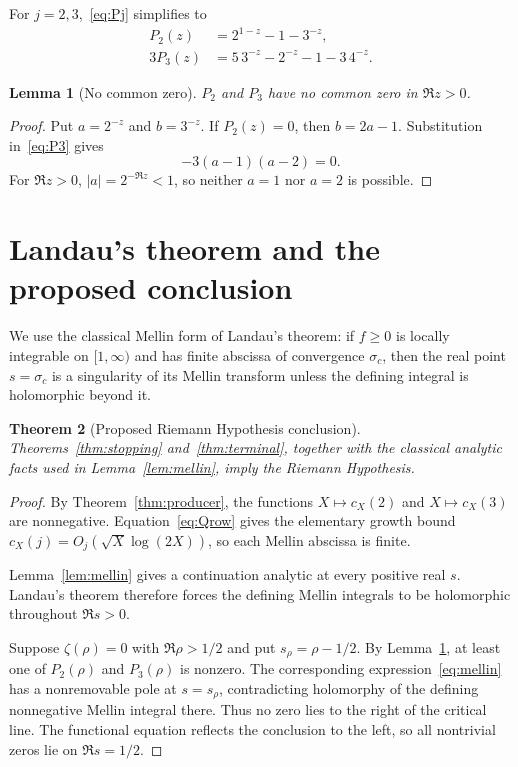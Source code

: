 \documentclass[11pt]{article}
\newtheorem{theorem}{Theorem}[section]
\newtheorem{lemma}[theorem]{Lemma}
\begin{document}
For $j=2,3$,~\eqref{eq:Pj} simplifies to
\begin{align}
 P_2(z)&=2^{1-z}-1-3^{-z},\label{eq:P2}\\
 3P_3(z)&=5\,3^{-z}-2^{-z}-1-3\,4^{-z}.
\label{eq:P3}
\end{align}

\begin{lemma}[No common zero]
\label{lem:nocommon}
$P_2$ and $P_3$ have no common zero in $\Re z>0$.
\end{lemma}
\begin{proof}
Put $a=2^{-z}$ and $b=3^{-z}$.  If $P_2(z)=0$, then $b=2a-1$.  Substitution in~\eqref{eq:P3} gives
\[
 -3(a-1)(a-2)=0.
\]
For $\Re z>0$, $|a|=2^{-\Re z}<1$, so neither $a=1$ nor $a=2$ is possible.
\end{proof}

\section{Landau's theorem and the proposed conclusion}
\label{sec:landau}

We use the classical Mellin form of Landau's theorem: if $f\ge0$ is locally integrable on $[1,\infty)$ and has finite abscissa of convergence $\sigma_c$, then the real point $s=\sigma_c$ is a singularity of its Mellin transform unless the defining integral is holomorphic beyond it.

\begin{theorem}[Proposed Riemann Hypothesis conclusion]
\label{thm:rh}
Theorems~\ref{thm:stopping} and~\ref{thm:terminal}, together with the classical analytic facts used in Lemma~\ref{lem:mellin}, imply the Riemann Hypothesis.
\end{theorem}
\begin{proof}
By Theorem~\ref{thm:producer}, the functions $X\mapsto c_X(2)$ and $X\mapsto c_X(3)$ are nonnegative.  Equation~\eqref{eq:Qrow} gives the elementary growth bound $c_X(j)=O_j(\sqrt X\log(2X))$, so each Mellin abscissa is finite.

Lemma~\ref{lem:mellin} gives a continuation analytic at every positive real $s$.  Landau's theorem therefore forces the defining Mellin integrals to be holomorphic throughout $\Re s>0$.

Suppose $\zeta(\rho)=0$ with $\Re\rho>1/2$ and put $s_\rho=\rho-1/2$.  By Lemma~\ref{lem:nocommon}, at least one of $P_2(\rho)$ and $P_3(\rho)$ is nonzero.  The corresponding expression~\eqref{eq:mellin} has a nonremovable pole at $s=s_\rho$, contradicting holomorphy of the defining nonnegative Mellin integral there.  Thus no zero lies to the right of the critical line.  The functional equation reflects the conclusion to the left, so all nontrivial zeros lie on $\Re s=1/2$.
\end{proof}
\end{document}
